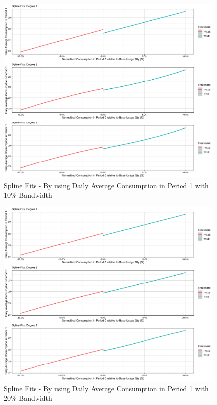 \clearpage
\begin{figure}
    \centering
    \includegraphics[scale = 0.13]{02_Plots/SMUD-Billing-Data_RD-Approach_Spline_BW-10}
    \caption{Spline Fits - By using Daily Average Consumption in Period 1 with 10\% Bandwidth}
    \label{Figure:Spline_10P}
\end{figure}

\clearpage
\begin{figure}
    \centering
    \includegraphics[scale = 0.13]{02_Plots/SMUD-Billing-Data_RD-Approach_Spline_BW-20}
    \caption{Spline Fits - By using Daily Average Consumption in Period 1 with 20\% Bandwidth}
    \label{Figure:Spline_20P}
\end{figure}

